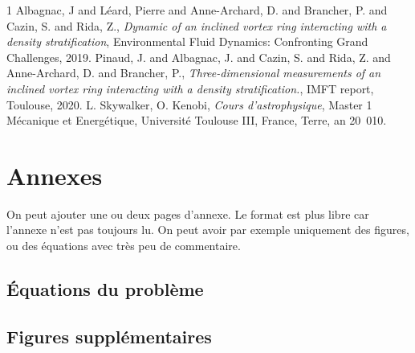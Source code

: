 
\begin{thebibliography}{1}
  Albagnac, J and L\'eard, Pierre and Anne-Archard, D. and Brancher, P. and Cazin, S. and
Rida, Z., \emph{Dynamic of an inclined vortex ring interacting with a density stratification},
Environmental Fluid Dynamics: Confronting Grand Challenges,  2019.
 Pinaud, J. and Albagnac, J. and Cazin, S. and Rida, Z. and  Anne-Archard, D. and Brancher, P.,
\emph{Three-dimensional measurements of an inclined vortex ring interacting with a density stratification.}, IMFT report, Toulouse, 2020.
 L. Skywalker, O. Kenobi, \emph{Cours d'astrophysique}, Master 1 Mécanique et Energétique, Université Toulouse III, France, Terre, an 20~010. 
\end{thebibliography}

\section{Annexes}

On peut ajouter une ou deux pages d'annexe. Le format est plus libre car
l'annexe n'est pas toujours lu. On peut avoir par exemple uniquement des figures, ou des équations avec très peu de commentaire.

\subsection{\'Equations du problème}

\vspace{2cm}

\subsection{Figures supplémentaires} 

\vspace{2cm}



     
